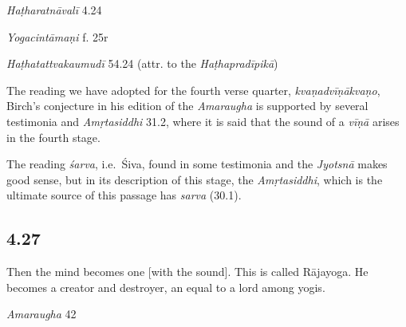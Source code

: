 \begin{ekdosis}
\begin{testimonia}[hp04_026]
\emph{Haṭharatnāvalī} 4.24
\begin{versinnote}
\end{versinnote} 

\emph{Yogacintāmaṇi} f. 25r
\begin{versinnote}
\end{versinnote}

\emph{Haṭhatattvakaumudī} 54.24 (attr. to the \emph{Haṭhapradīpikā})
\begin{versinnote}
\end{versinnote}
\end{testimonia}

\begin{philcomm}[hp04_026]
The reading we have adopted for the fourth verse quarter, \emph{kvaṇadvīṇākvaṇo}, Birch’s conjecture in his edition of the \emph{Amaraugha} is supported by several testimonia and \emph{Amṛtasiddhi} 31.2, where it is said that the sound of a \emph{vīṇā} arises in the fourth stage.\lb

The reading \emph{śarva}, i.e.~Śiva, found in some testimonia and the \emph{Jyotsnā} makes good sense, but in its description of this stage, the \emph{Amṛtasiddhi}, which is the ultimate source of this passage has \emph{sarva} (30.1).
\end{philcomm}

\subsection*{4.27}
\begin{translation}[hp04_027]
Then the mind becomes one [with the sound]. This is called Rājayoga. He becomes a creator and destroyer, an equal to a lord among yogis.%
\end{translation}

\begin{sources}[hp04_027]
\emph{Amaraugha} 42
\begin{versinnote}
\tl{\var{rājayogābhidhānakam ] rājayogo 'bhidhīyate Ae}\\!}
\end{versinnote}
\end{sources}


\end{ekdosis}
